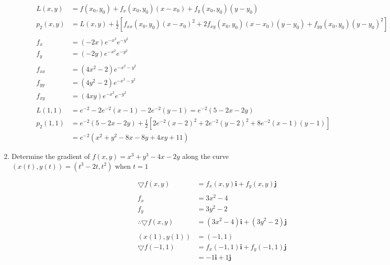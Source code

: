 \documentclass[a4paper,11pt]{article}
\begin{document}
\begin{preview}
\begin{enumerate}
\begin{enumerate}
        \begin{align*}
            L(x,y) &= f(x_0, y_0) + f_x(x_0, y_0)(x-x_0) + f_y(x_0, y_0)(y-y_0)\\
            p_2(x,y) &= L(x,y) + \frac{1}{2}\left[ f_{xx}(x_0, y_0)(x-x_0)^2 + 2f_{xy}(x_0, y_0)(x-x_0)(y-y_0) + f_{yy}(x_0, y_0)(y-y_0)^2 \right]\\\\
            f_x     &= (-2x) e^{-x^2}e^{-y^2}             \\
            f_y     &= (-2y) e^{-x^2}e^{-y^2}             \\\\
            f_{xx}  &= (4 x^2 - 2) e^{-x^2 - y^2}         \\
            f_{yy}  &= (4 y^2 - 2) e^{-x^2 - y^2}         \\
            f_{xy}  &= (4xy) e^{-x^2}e^{-y^2}             \\\\
            L(1,1)  &= e^{-2} -2e^{-2}(x-1) - 2e^{-2}(y-1) = e^{-2}(5-2x-2y)\\
            p_2(1,1)&= e^{-2}(5-2x-2y) + \frac{1}{2} \left[  2e^{-2}(x-2)^2 + 2e^{-2}(y-2)^2 + 8e^{-2}(x-1)(y-1)\right] \\
                    &= e^{-2}(x^2 + y^2 -8x -8y +4xy +11)
        \end{align*}

        \item Determine the gradient of $f(x,y) = x^3+y^3-4x-2y$ along the curve \\$(x(t), y(t)) = (t^3 - 2t, t^2)$ when $t=1$
        
        \begin{align*}
            \bigtriangledown f(x,y) &= f_x(x,y)\textbf{i} + f_y(x,y)\textbf{j}\\\\
            f_x &= 3x^2 -4\\
            f_y &= 3y^2 -2\\
            \therefore \bigtriangledown f(x,y) &= (3x^2 -4)\textbf{i} + (3y^2 -2)\textbf{j}\\\\
            (x(1),y(1)) &= (-1,1)\\
            \bigtriangledown f(-1,1) &= f_x(-1,1)\textbf{i} + f_y(-1,1)\textbf{j}\\
            &= -1 \textbf{i} + 1 \textbf{j}
        \end{align*}


\end{enumerate}
\end{enumerate}
\end{preview}
\end{document}
